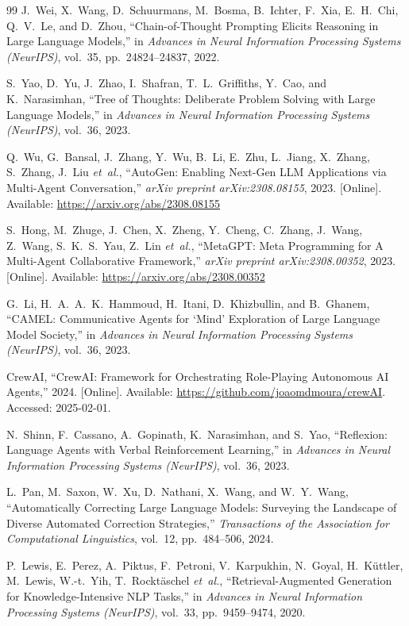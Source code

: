 \documentclass[journal]{IEEEtran}
\begin{document}
\begin{thebibliography}{99}
J.~Wei, X.~Wang, D.~Schuurmans, M.~Bosma, B.~Ichter, F.~Xia, E.~H.~Chi, Q.~V.~Le, and D.~Zhou, ``Chain-of-Thought Prompting Elicits Reasoning in Large Language Models,'' in \textit{Advances in Neural Information Processing Systems (NeurIPS)}, vol.~35, pp.~24824--24837, 2022.

S.~Yao, D.~Yu, J.~Zhao, I.~Shafran, T.~L.~Griffiths, Y.~Cao, and K.~Narasimhan, ``Tree of Thoughts: Deliberate Problem Solving with Large Language Models,'' in \textit{Advances in Neural Information Processing Systems (NeurIPS)}, vol.~36, 2023.

Q.~Wu, G.~Bansal, J.~Zhang, Y.~Wu, B.~Li, E.~Zhu, L.~Jiang, X.~Zhang, S.~Zhang, J.~Liu \textit{et~al.}, ``{AutoGen}: Enabling Next-Gen {LLM} Applications via Multi-Agent Conversation,'' \textit{arXiv preprint arXiv:2308.08155}, 2023. [Online]. Available: \url{https://arxiv.org/abs/2308.08155}

S.~Hong, M.~Zhuge, J.~Chen, X.~Zheng, Y.~Cheng, C.~Zhang, J.~Wang, Z.~Wang, S.~K.~S.~Yau, Z.~Lin \textit{et~al.}, ``{MetaGPT}: Meta Programming for A Multi-Agent Collaborative Framework,'' \textit{arXiv preprint arXiv:2308.00352}, 2023. [Online]. Available: \url{https://arxiv.org/abs/2308.00352}

G.~Li, H.~A.~A.~K.~Hammoud, H.~Itani, D.~Khizbullin, and B.~Ghanem, ``{CAMEL}: Communicative Agents for `Mind' Exploration of Large Language Model Society,'' in \textit{Advances in Neural Information Processing Systems (NeurIPS)}, vol.~36, 2023.

{CrewAI}, ``{CrewAI}: Framework for Orchestrating Role-Playing Autonomous AI Agents,'' 2024. [Online]. Available: \url{https://github.com/joaomdmoura/crewAI}. Accessed: 2025-02-01.

N.~Shinn, F.~Cassano, A.~Gopinath, K.~Narasimhan, and S.~Yao, ``Reflexion: Language Agents with Verbal Reinforcement Learning,'' in \textit{Advances in Neural Information Processing Systems (NeurIPS)}, vol.~36, 2023.

L.~Pan, M.~Saxon, W.~Xu, D.~Nathani, X.~Wang, and W.~Y.~Wang, ``Automatically Correcting Large Language Models: Surveying the Landscape of Diverse Automated Correction Strategies,'' \textit{Transactions of the Association for Computational Linguistics}, vol.~12, pp.~484--506, 2024.

P.~Lewis, E.~Perez, A.~Piktus, F.~Petroni, V.~Karpukhin, N.~Goyal, H.~K{\"u}ttler, M.~Lewis, W.-t.~Yih, T.~Rockt{\"a}schel \textit{et~al.}, ``Retrieval-Augmented Generation for Knowledge-Intensive {NLP} Tasks,'' in \textit{Advances in Neural Information Processing Systems (NeurIPS)}, vol.~33, pp.~9459--9474, 2020.


\end{thebibliography}
\end{document}
